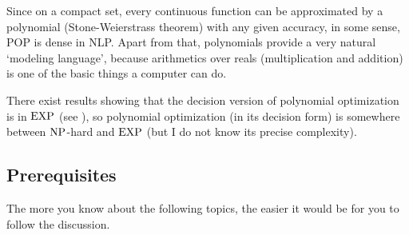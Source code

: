 Since on a compact set, every continuous function can be approximated by a polynomial (Stone-Weierstrass theorem) with any given accuracy, in some sense, POP is dense in NLP. Apart from that, polynomials provide a very natural `modeling language', because arithmetics over reals (multiplication and addition) is one of the basic things a computer can do.  

There exist results showing that the decision version of polynomial optimization is in $\operatorname{EXP}$ (see \cite{MR3212780}), so polynomial optimization (in its decision form) is somewhere between $\operatorname{NP}$-hard and $\operatorname{EXP}$ (but I do not know its precise complexity). 




\subsection{Prerequisites}

The more you know about the following topics, the easier it would be for you to follow the discussion. 

